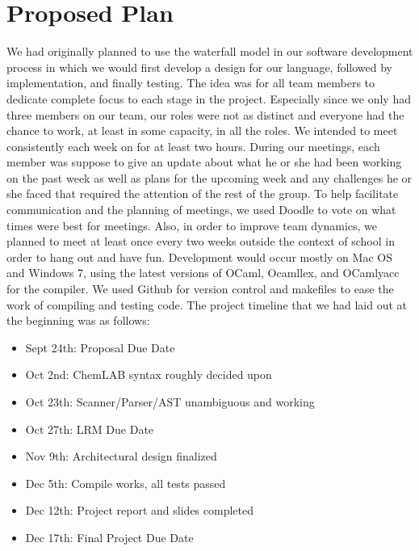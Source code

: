 \documentclass[11pt]{report}
\begin{document}
\section{Proposed Plan}
We had originally planned to use the waterfall model in our software development process in which we would first develop a design for our language, followed by implementation, and finally testing. The idea was for all team members to dedicate complete focus to each stage in the project. Especially since we only had three members on our team, our roles were not as distinct and everyone had the chance to work, at least in some capacity, in all the roles. We intended to meet consistently each week on for at least two hours. During our meetings, each member was suppose to give an update about what he or she had been working on the past week as well as plans for the upcoming week and any challenges he or she faced that required the attention of the rest of the group. To help facilitate communication and the planning of meetings, we used Doodle to vote on what times were best for meetings. Also, in order to improve team dynamics, we planned to meet at least once every two weeks outside the context of school in order to hang out and have fun. Development would occur mostly on  Mac OS and Windows 7, using the latest versions of OCaml, Ocamllex, and OCamlyacc for the compiler.  We used Github for version control and makefiles to ease the work of compiling and testing code. The project timeline that we had laid out at the beginning was as follows:
\begin{itemize}
\item Sept 24th: Proposal Due Date
\item Oct 2nd: ChemLAB syntax roughly decided upon
\item Oct 23th: Scanner/Parser/AST unambiguous and working
\item Oct 27th: LRM Due Date
\item Nov 9th: Architectural design finalized
\item Dec 5th: Compile works, all tests passed
\item Dec 12th: Project report and slides completed 
\item Dec 17th: Final Project Due Date 
\end{itemize}
\end{document}
